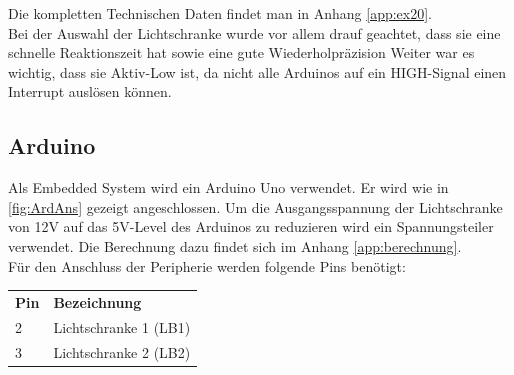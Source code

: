 Die kompletten Technischen Daten findet man in Anhang \ref{app:ex20}.\\

Bei der Auswahl der Lichtschranke wurde vor allem drauf geachtet, dass sie eine schnelle Reaktionszeit hat sowie eine gute Wiederholpräzision Weiter war es wichtig, dass sie Aktiv-Low ist, da nicht alle Arduinos auf ein HIGH-Signal einen Interrupt auslösen können.\\
\clearpage

\subsection{Arduino}
Als  Embedded System wird ein Arduino Uno verwendet. Er wird wie in \ref{fig:ArdAns} gezeigt angeschlossen. Um die Ausgangsspannung der Lichtschranke von 12V auf das 5V-Level des Arduinos zu reduzieren wird ein Spannungsteiler verwendet. Die Berechnung dazu findet sich im Anhang \ref{app:berechnung}.\\


Für den Anschluss der Peripherie werden folgende Pins benötigt:\newline
\begin{tabular}{ll}
    \textbf{Pin} & \textbf{Bezeichnung}\\
    2 & Lichtschranke 1 (LB1)\\
    3 & Lichtschranke 2 (LB2)\\
\end{tabular}

